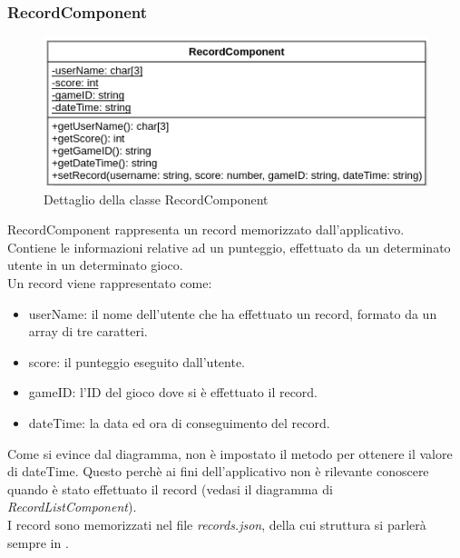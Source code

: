 \subsubsection{RecordComponent}
\label{subsec:recordComponent}
\begin{figure}[h]
    \centering
    \includegraphics[width=340pt]{images/prog/Record.png}
    \caption{Dettaglio della classe RecordComponent}
    \label{fig:recordComponent}
\end{figure}
RecordComponent rappresenta un record memorizzato dall'applicativo.\\ Contiene le informazioni relative ad un punteggio, effettuato da un determinato utente in un determinato gioco.\\
Un record viene rappresentato come:
\begin{itemize}
    \item userName: il nome dell'utente che ha effettuato un record, formato da un array di tre caratteri.
    \item score: il punteggio eseguito dall'utente.
    \item gameID: l'ID del gioco dove si è effettuato il record.
    \item dateTime: la data ed ora di conseguimento del record.
\end{itemize}
Come si evince dal diagramma, non è impostato il metodo per ottenere il valore di dateTime. Questo perchè ai fini dell'applicativo non è rilevante conoscere quando è stato effettuato il record (vedasi il diagramma di \emph{RecordListComponent}).\\
I record sono memorizzati nel file \emph{records.json}, della cui struttura si parlerà sempre in .
